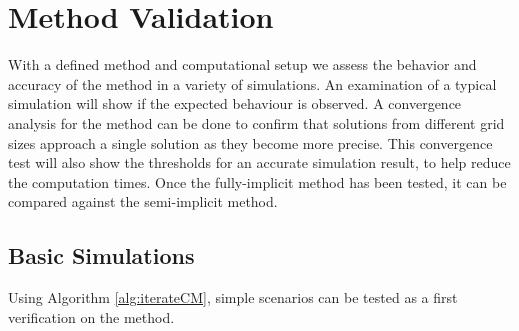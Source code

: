 \section{Method Validation}

  With a defined method and computational setup we assess the behavior and accuracy of the method in a variety of simulations.
  An examination of a typical simulation will show if the expected behaviour is observed.
  A convergence analysis for the method can be done to confirm that solutions from different grid sizes approach a single solution as they become more precise.
  This convergence test will also show the thresholds for an accurate simulation result, to help reduce the computation times.
  Once the fully-implicit method has been tested, it can be compared against the semi-implicit method.

\subsection{Basic Simulations}

  Using Algorithm \ref{alg:iterateCM}, simple scenarios can be tested as a first verification on the method.

  

